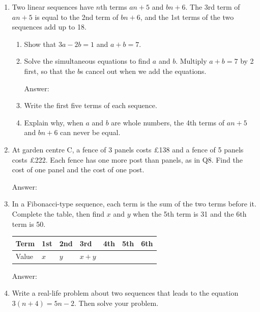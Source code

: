 \documentclass[11pt,a4paper]{article}
\newcommand{\ansline}[1][2.2cm]{\underline{\hspace{#1}}}
\newcommand{\workspace}[1]{\par\vspace{#1}\hfill Answer: \ansline[3.5cm]\par}
\newcommand{\rowstrut}{\rule[-1.9mm]{0pt}{5.8mm}}
\begin{document}
\begin{enumerate}[resume]
\newpage
\item Two linear sequences have $n$th terms $an+5$ and $bn+6$. The 3rd term of $an+5$ is
equal to the 2nd term of $bn+6$, and the 1st terms of the two sequences add up to 18.
\begin{enumerate}
\item Show that $3a-2b=1$ and $a+b=7$. \hrulefill
\item Solve the simultaneous equations to find $a$ and $b$. Multiply $a+b=7$ by 2
  first, so that the $b$s cancel out when we add the equations.
  \workspace{2.8cm}
\item Write the first five terms of each sequence. \hfill \ansline[4cm] \quad \ansline[4cm]
\item Explain why, when $a$ and $b$ are whole numbers, the 4th terms of $an+5$ and
  $bn+6$ can never be equal. \hrulefill
\end{enumerate}

\item At garden centre C, a fence of 3 panels costs \pounds138 and a fence of 5 panels
costs \pounds222. Each fence has one more post than panels, as in Q8. Find the cost
of one panel and the cost of one post.
\workspace{3.0cm}

\item In a Fibonacci-type sequence, each term is the sum of the two terms before it.
Complete the table, then find $x$ and $y$ when the 5th term is 31 and the 6th term
is 50.\par\smallskip
{\setlength{\tabcolsep}{3pt}\renewcommand{\arraystretch}{1.3}%
\begin{tabular}{|l|*{6}{C{1.5cm}|}}\hline
{\small Term} & 1st & 2nd & 3rd & 4th & 5th & 6th\\\hline
{\small Value}\rowstrut & $x$ & $y$ & $x+y$ & & & \\\hline
\end{tabular}}
\workspace{2.6cm}

\item Write a real-life problem about two sequences that leads to the equation
$3(n+4)=5n-2$. Then solve your problem.
\par\vspace{2.2cm}\hrulefill\par\vspace{9pt}\hrulefill


\end{enumerate}
\end{document}
